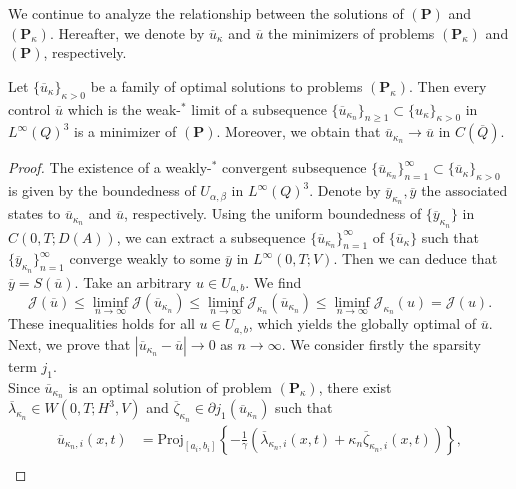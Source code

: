 \documentclass[reqno]{amsart}
\begin{document}
	We continue to analyze the relationship between the solutions of $(\textbf{P})$ and $(\textbf{P}_{\kappa})$. Hereafter, we denote by $\overline{u}_\kappa$ and $\overline{u}$ the minimizers of problems $(\textbf{P}_\kappa)$ and $(\textbf{P})$, respectively.
	\begin{theorem}\label{theo6.1}
		Let $\{\overline{u}_\kappa\}_{\kappa>0}$ be a family of optimal solutions to problems $(\textbf{P}_\kappa)$. Then every control $\overline{u}$ which is the weak-$^*$ limit of a subsequence $\{\overline{u}_{\kappa_n}\}_{n\geq1} \subset \{u_\kappa\}_{\kappa>0}$ in $L^\infty(Q)^3$  is a minimizer of $(\textbf{P})$. Moreover, we obtain that $\overline{u}_{\kappa_n} \rightarrow \overline{u}$ in $C(\overline{Q})$.
	\end{theorem}
	\begin{proof}
		The existence of  a weakly-$^*$ convergent subsequence $\{\overline{u}_{\kappa_n}\}_{n=1}^{\infty} \subset \{\overline{u}_{\kappa}\}_{\kappa>0}$ is given by the boundedness of $U_{\alpha,\beta}$ in $L^\infty(Q)^3$. Denote by $\overline{y}_{{\kappa_n}}, \overline{y}$ the associated states to $\overline{u}_{\kappa_n}$ and $\overline{u}$, respectively. Using the uniform boundedness of $\{\overline{y}_{{\kappa_n}}\}$ in $C(0,T;D(A))$, we can extract a subsequence $\{\overline{u}_{\kappa_n}\}_{n=1}^{\infty}$ of $\{\overline{u}_\kappa\}$ such that $\{\overline{y}_{{\kappa_n}}\}_{n=1}^{\infty}$ converge weakly to some $\overline{y}$ in $L^\infty(0,T;V)$. Then we can deduce that $\overline{y}=S(\overline{u})$.    
		Take an arbitrary $u \in U_{a,b}$. We find
		\begin{equation*}
			\mathcal{J}(\overline{u}) \leq \liminf_{n \to \infty} \mathcal{J}(\overline{u}_{\kappa_n}) \leq \liminf_{n \to \infty} \mathcal{J}_{\kappa_n} (\overline{u}_{\kappa_n}) \leq \liminf_{n \to \infty} \mathcal{J}_{\kappa_n} (u) = \mathcal{J}(u).
		\end{equation*}
		These inequalities holds for all $u \in U_{a,b}$, which yields the globally optimal of $\overline{u}$.
		Next, we prove that $\left\vert \overline{u}_{\kappa_n} - \overline{u} \right\vert \rightarrow 0$ as $n \rightarrow \infty$. We consider firstly the sparsity term $j_1$.\\
		Since $\overline{u}_{\kappa_n}$ is an optimal solution of problem $(\textbf{P}_\kappa)$, there exist $\overline{\lambda}_{{\kappa_n}} \in W(0,T;H^3,V)$ and $\overline{\zeta}_{\kappa_n}\in \partial j_1(\overline{u}_{\kappa_n})$ such that
		\begin{align}
			\overline{u}_{\kappa_n,i}(x,t) &= \text{Proj}_{[a_i, b_i]} \left\{ -\frac{1}{\gamma} (\overline{\lambda}_{\kappa_n,i}(x,t) + \kappa_n \overline{\zeta}_{\kappa_n,i}(x,t)) \right\}, \label{6.1.1}\\

\end{align}
\end{proof}
\end{document}
